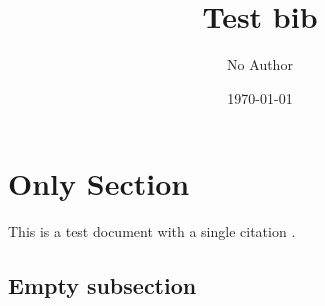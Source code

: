 \documentclass[11pt,a4paper]{article}
\author{No Author}
\title{Test bib}
\date{\today}
\begin{document}
\maketitle
\tableofcontents

\section{Only Section}

This is a test document with a single citation \cite{testarticle}.

\subsection{Empty subsection}



\end{document}
